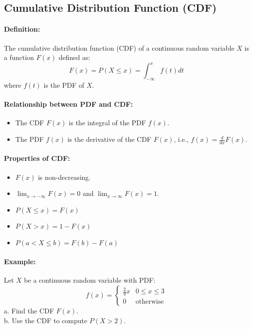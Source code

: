 \subsection{Cumulative Distribution Function (CDF)}
\hrulefill

\paragraph{Definition:} The cumulative distribution function (CDF) of a continuous random variable $X$ is a function 
$F(x)$ defined as:
\[
    F(x) = P(X \leq x) = \int_{-\infty}^{x} f(t) dt
\]
where $f(t)$ is the PDF of $X$.

\paragraph{Relationship between PDF and CDF:}
\begin{itemize}
    \item The CDF $F(x)$ is the integral of the PDF $f(x)$.
    \item The PDF $f(x)$ is the derivative of the CDF $F(x)$, i.e., $f(x) = \frac{d}{dx} F(x)$.
\end{itemize}

\paragraph{Properties of CDF:}
\begin{itemize}
    \item $F(x)$ is non-decreasing.
    \item $\lim_{x \to -\infty} F(x) = 0$ and $\lim_{x \to \infty} F(x) = 1$.
    \item $P(X \leq x) = F(x)$
    \item $P(X > x) = 1 - F(x)$
    \item $P(a < X \leq b) = F(b) - F(a)$
\end{itemize}

\paragraph*{Example:}
Let $X$ be a continuous random variable with PDF:
\[
    f(x) = \begin{cases}
        \frac{2}{9} x & 0 \leq x \leq 3 \\
        0 & \text{otherwise}
    \end{cases}
\]
a. Find the CDF $F(x)$.\\
b. Use the CDF to compute $P(X > 2)$.\\

